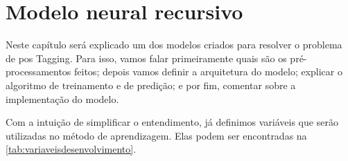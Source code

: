 \chapter{Modelo neural recursivo}\label{modeloneuralrecursivo}

Neste capítulo será explicado um dos modelos criados para resolver o problema de \ac{pos} Tagging. Para isso, vamos falar primeiramente quais são os pré-processamentos feitos; depois vamos definir a arquitetura do modelo; explicar o algoritmo de treinamento e de predição; e por fim, comentar sobre a implementação do modelo.

Com a intuição de simplificar o entendimento, já definimos variáveis que serão utilizadas no método de aprendizagem. Elas podem ser encontradas na \autoref{tab:variaveisdesenvolvimento}.
